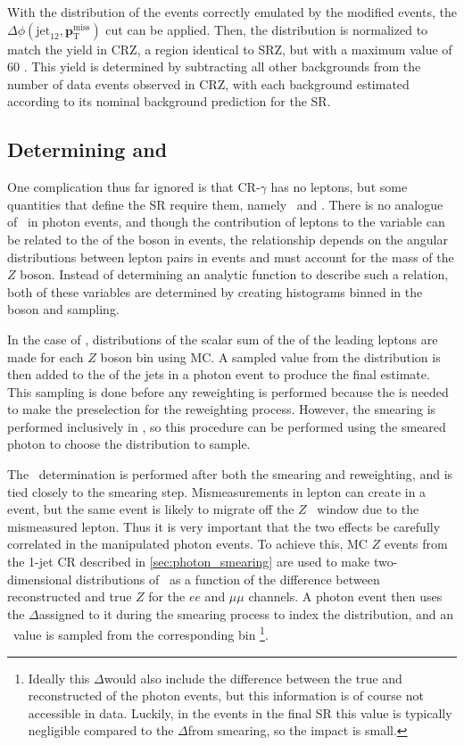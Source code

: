 With the \met distribution of the \dyjets events correctly emulated by the modified \gjets events, the $\Delta\phi(\text{jet}_{12},{\boldsymbol p}_{\mathrm{T}}^\mathrm{miss})$ cut can be applied. Then, the \gjets distribution is normalized to match the \dyjets yield in CRZ, a region identical to SRZ, but with a maximum \met value of 60 \gev. This yield is determined by subtracting all other backgrounds from the number of data events observed in CRZ, with each background estimated according to its nominal background prediction for the \ac{SR}. 

\subsection{Determining \HT and \mll}
\label{sec:photon_mll}

One complication thus far ignored is that CR-$\gamma$ has no leptons, but some quantities that define the \ac{SR} require them, namely \mll~and \HT. There is no analogue of \mll~in photon events, and though the contribution of leptons to the \HT variable can be related to the \pt of the boson in \gjets events, the relationship depends on the angular distributions between lepton pairs in \dyjets events and must account for the mass of the $Z$ boson. Instead of determining an analytic function to describe such a relation, both of these variables are determined by creating histograms binned in the boson \pt and sampling. 

In the case of \HT, distributions of the scalar sum of the \pt of the leading leptons are made for each $Z$ boson \pt bin using \dyjets \ac{MC}. A sampled value from the distribution is then added to the \HT of the jets in a photon event to produce the final estimate. This sampling is done before any reweighting is performed because the \HT is needed to make the preselection for the reweighting process. However, the smearing is performed inclusively in \HT, so this procedure can be performed using the smeared photon \pt to choose the distribution to sample. 

The \mll~determination is performed after both the smearing and reweighting, and is tied closely to the smearing step. Mismeasurements in lepton \pt can create \met in a \dyjets event, but the same event is likely to migrate off the $Z$ \mll~window due to the mismeasured lepton. Thus it is very important that the two effects be carefully correlated in the manipulated photon events. To achieve this, \ac{MC} $Z$ events from the 1-jet \ac{CR} described in \autoref{sec:photon_smearing} are used to make two-dimensional distributions of \mll~as a function of the difference between reconstructed and true $Z$ \pt for the $ee$ and $\mu\mu$ channels. A photon event then uses the $\Delta$\pt assigned to it during the smearing process to index the distribution, and an \mll~value is sampled from the corresponding bin \footnote{Ideally this $\Delta$\pt would also include the difference between the true and reconstructed \pt of the photon events, but this information is of course not accessible in data. Luckily, in the events in the final \ac{SR} this value is typically negligible compared to the $\Delta$\pt from smearing, so the impact is small.}. 

